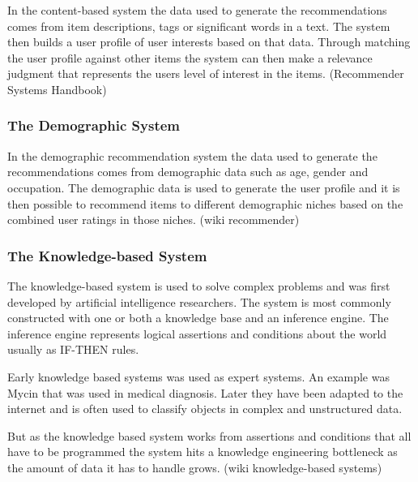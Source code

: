 In the content-based system the data used to generate the recommendations comes from item descriptions, tags or significant words in a text. The system then builds a user profile of user interests based on that data. Through matching the user profile against other items the system can then make a relevance judgment that represents the users level of interest in the items. (Recommender Systems Handbook)


\subsubsection{The Demographic System}

In the demographic recommendation system the data used to generate the recommendations comes from demographic data such as age, gender and occupation. The demographic data is used to generate the user profile and it is then possible to recommend items to different demographic niches based on the combined user ratings in those niches. (wiki recommender)


\subsubsection{The Knowledge-based System}

The knowledge-based system is used to solve complex problems and was first developed by artificial intelligence researchers. The system is most commonly constructed with one or both a knowledge base  and an inference engine. The inference engine represents logical assertions and conditions about the world usually as IF-THEN rules.

Early knowledge based systems was used as expert systems. An example was Mycin that was used in medical diagnosis. Later they have been adapted to the internet and is often used to classify objects in complex and unstructured data.

But as the knowledge based system works from assertions and conditions that all have to be programmed the system hits a knowledge engineering bottleneck as the amount of data it has to handle grows. (wiki knowledge-based systems)

